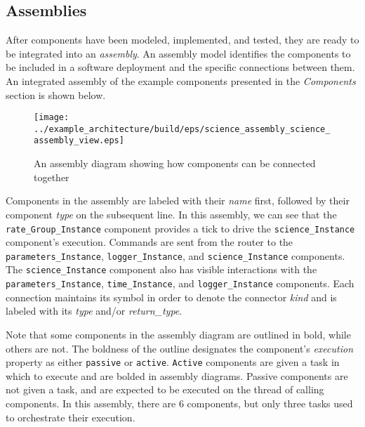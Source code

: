 \subsection{Assemblies}

After components have been modeled, implemented, and tested, they are ready to be integrated into an \textit{assembly}. An assembly model identifies the components to be included in a software deployment and the specific connections between them. An integrated assembly of the example components presented in the \textit{Components} section is shown below.

\begin{figure}[H]
  \texttt{[image: ../example\_architecture/build/eps/science\_assembly\_science\_assembly\_view.eps]}
  \caption{An assembly diagram showing how components can be connected together}
\end{figure}

Components in the assembly are labeled with their \textit{name} first, followed by their component \textit{type} on the subsequent line. In this assembly, we can see that the \texttt{rate\_Group\_Instance} component provides a tick to drive the \texttt{science\_Instance} component's execution. Commands are sent from the router to the \texttt{parameters\_Instance}, \texttt{logger\_Instance}, and \texttt{science\_Instance} components. The \texttt{science\_Instance} component also has visible interactions with the \texttt{parameters\_Instance}, \texttt{time\_Instance}, and \texttt{logger\_Instance} components. Each connection maintains its symbol in order to denote the connector \textit{kind} and is labeled with its \textit{type} and/or \textit{return\_type}.

Note that some components in the assembly diagram are outlined in bold, while others are not. The boldness of the outline designates the component's \textit{execution} property as either \texttt{passive} or \texttt{active}. \texttt{Active} components are given a task in which to execute and are bolded in assembly diagrams. Passive components are not given a task, and are expected to be executed on the thread of calling components. In this assembly, there are 6 components, but only three tasks used to orchestrate their execution.

